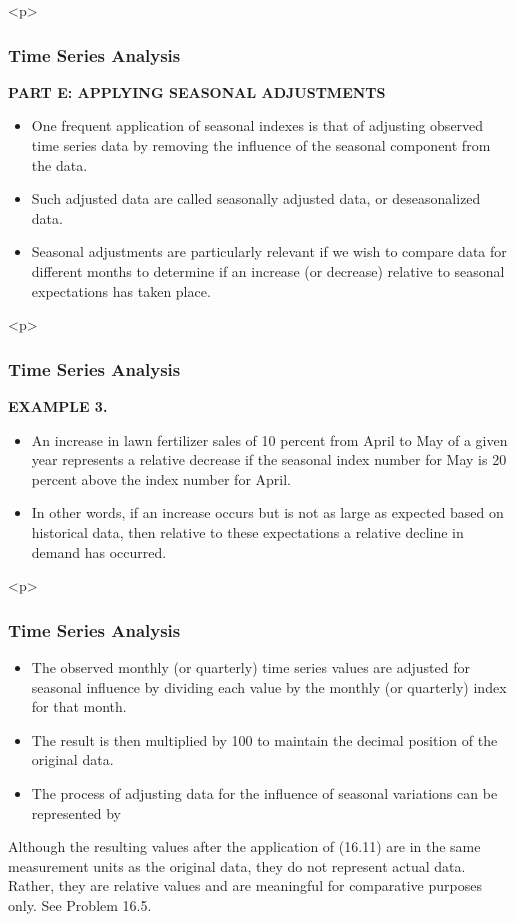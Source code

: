 \documentclass{beamer}
\begin{document}
\begin{itemize}
<p>
\frametitle{Time Series Analysis}
\textbf{PART E: APPLYING SEASONAL ADJUSTMENTS}
\begin{itemize}

\item One frequent application of seasonal indexes is that of adjusting observed time series data by removing the
influence of the seasonal component from the data. 
\item Such adjusted data are called seasonally adjusted data, or
deseasonalized data. 
\item Seasonal adjustments are particularly relevant if we wish to compare data for different
months to determine if an increase (or decrease) relative to seasonal expectations has taken place.
\end{itemize}

<p>
\frametitle{Time Series Analysis}
\textbf{EXAMPLE 3. }
\begin{itemize}
\item An increase in lawn fertilizer sales of 10 percent from April to May of a given year represents a relative
decrease if the seasonal index number for May is 20 percent above the index number for April. 
\item In other words, if an increase
occurs but is not as large as expected based on historical data, then relative to these expectations a relative decline in demand
has occurred.
\end{itemize}


<p>
\frametitle{Time Series Analysis}
\begin{itemize}
\item The observed monthly (or quarterly) time series values are adjusted for seasonal influence by dividing each
value by the monthly (or quarterly) index for that month. 
\item The result is then multiplied by 100 to maintain the
decimal position of the original data.
\item The process of adjusting data for the influence of seasonal variations can
be represented by
\end{itemize}

Although the resulting values after the application of (16.11) are in the same measurement units as the
original data, they do not represent actual data. Rather, they are relative values and are meaningful for
comparative purposes only. See Problem 16.5.



\end{itemize}
\end{document}
